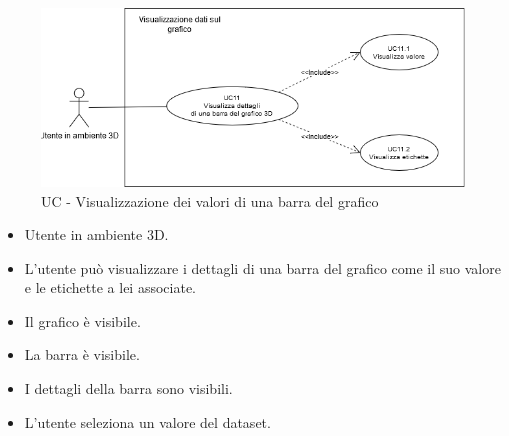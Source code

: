 \begin{figure}[h!]\centering
    \includegraphics[scale=0.7]{template/images/UC11.png}
    \caption{UC - Visualizzazione dei valori di una barra del grafico}
\end{figure}
\UCdsc
{ %
    \begin{itemize}
        \item Utente in ambiente 3D.
    \end{itemize}
}
{ %
    \begin{itemize}
        \item L'utente può visualizzare i dettagli di una barra del grafico come il suo valore e le etichette a lei associate.
    \end{itemize}
}
{ %
    \begin{itemize}
        \item Il grafico è visibile.
        \item La barra è visibile.
    \end{itemize}
}
{ %
    \begin{itemize}
        \item I dettagli della barra sono visibili.
    \end{itemize}
}
{ %
    \begin{itemize}
        \item L'utente seleziona un valore del dataset. 
    \end{itemize}
}

